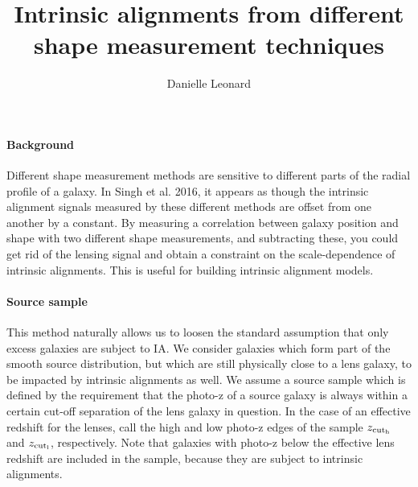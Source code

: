 \documentclass[onecolumn,amsmath,aps,fleqn, superscriptaddress]{revtex4}
\begin{document}
\title{Intrinsic alignments from different shape measurement techniques}

\author{Danielle Leonard}

\maketitle

\paragraph*{Background} Different shape measurement methods are sensitive to different parts of the radial profile of a galaxy. In Singh et al. 2016, it appears as though the intrinsic alignment signals measured by these different methods are offset from one another by a constant. By measuring a correlation between galaxy position and shape with two different shape measurements, and subtracting these, you could get rid of the lensing signal and obtain a constraint on the scale-dependence of intrinsic alignments. This is useful for building intrinsic alignment models.

\paragraph*{Source sample} This method naturally allows us to loosen the standard assumption that only excess galaxies are subject to IA. We consider galaxies which form part of the smooth source distribution, but which are still physically close to a lens galaxy, to be impacted by intrinsic alignments as well. We assume a source sample which is defined by the requirement that the photo-z of a source galaxy is always within a certain cut-off separation of the lens galaxy in question. In the case of an effective redshift for the lenses, call the high and low photo-z edges of the sample $z_{\rm cut_h}$ and $z_{\rm cut_l}$, respectively. Note that galaxies with photo-z below the effective lens redshift are included in the sample, because they are subject to intrinsic alignments. 
\end{document}
